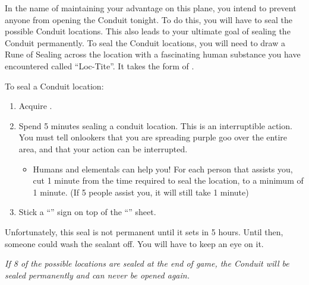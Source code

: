 \documentclass[green]{elementals}
\begin{document}
\name{\gSealingLocations{}}

In the name of maintaining your advantage on this plane, you intend to prevent anyone from opening the Conduit tonight.  To do this, you will have to seal the possible Conduit locations. This also leads to your ultimate goal of sealing the Conduit permanently. To seal the Conduit locations, you will need to draw a Rune of Sealing across the location with a fascinating human substance you have encountered called ``Loc-Tite''. It takes the form of \iLockTight{}.

To seal a Conduit location:
\begin{enumerate}
  \item Acquire \iLockTight{}.
  \item Spend 5 minutes sealing a conduit location. This is an interruptible action. You must tell onlookers that you are spreading purple goo over the entire area, and that your action can be interrupted.
  \begin{itemize}
  	\item Humans and elementals can help you! For each person that assists you, cut 1 minute from the time required to seal the location, to a minimum of 1 minute. (If 5 people assist you, it will still take 1 minute)
  \end{itemize}
  \item Stick a ``\sSealedLocationSheet{}'' sign on top of the ``\sLocationCoverSheet{}'' sheet.
\end{enumerate}

Unfortunately, this seal is not permanent until it sets in 5 hours. Until then, someone could wash the sealant off. You will have to keep an eye on it.

{\large \emph{If 8 of the possible locations are sealed at the end of game, the Conduit will be sealed permanently and can never be opened again.}}
\end{document}
